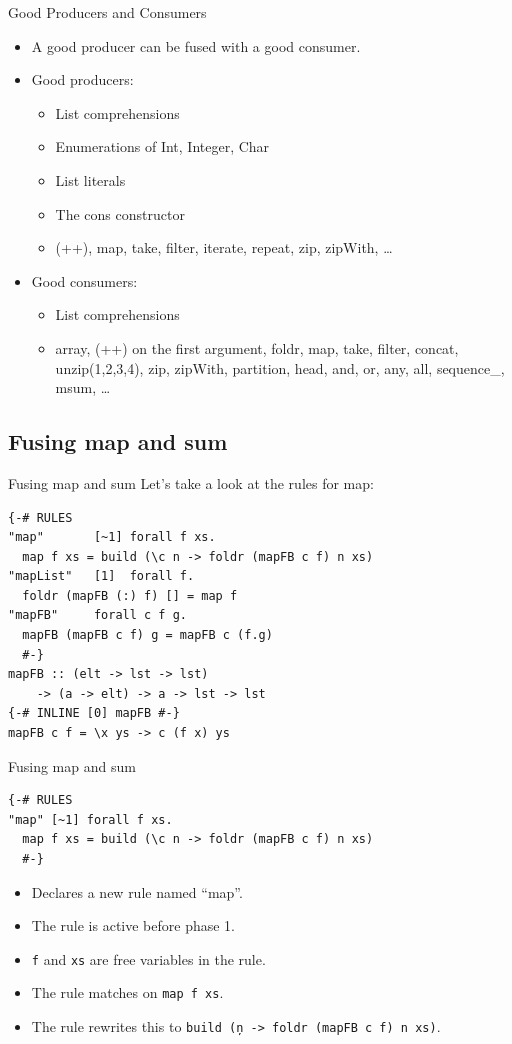 \documentclass[11pt]{beamer}
\begin{document}
\begin{frame}{Good Producers and Consumers}
	\begin{itemize}
		\item A good producer can be fused with a good consumer.
		\item Good producers:
		\begin{itemize}
			\item List comprehensions
			\item Enumerations of Int, Integer, Char
			\item List literals
			\item The cons constructor
			\item (++), map, take, filter, iterate, repeat, zip, zipWith, \dots
		\end{itemize}
		\item Good consumers:
		\begin{itemize}
			\item List comprehensions
			\item array, (++) on the first argument, foldr, map, take, filter, concat, unzip(1,2,3,4), zip, zipWith, partition, head, and, or, any, all, sequence\_, msum, \dots
		\end{itemize}
	\end{itemize}
\end{frame}

\subsection{Fusing map and sum}

\begin{frame}[fragile]{Fusing map and sum}
Let's take a look at the rules for map:
\begin{verbatim}
{-# RULES
"map"       [~1] forall f xs.
  map f xs = build (\c n -> foldr (mapFB c f) n xs)
"mapList"   [1]  forall f.
  foldr (mapFB (:) f) [] = map f
"mapFB"     forall c f g.
  mapFB (mapFB c f) g = mapFB c (f.g)
  #-}
mapFB :: (elt -> lst -> lst)
    -> (a -> elt) -> a -> lst -> lst
{-# INLINE [0] mapFB #-}
mapFB c f = \x ys -> c (f x) ys
\end{verbatim}
\end{frame}

\begin{frame}[fragile]{Fusing map and sum}
\begin{verbatim}
{-# RULES
"map" [~1] forall f xs.
  map f xs = build (\c n -> foldr (mapFB c f) n xs)
  #-}
\end{verbatim}
\begin{itemize}
	\item Declares a new rule named ``map''.
	\item The rule is active before phase 1.
	\item \texttt{f} and \texttt{xs} are free variables in the rule.
	\item The rule matches on \texttt{map f xs}.
	\item The rule rewrites this to \texttt{build (\c n -> foldr (mapFB c f) n xs)}.
\end{itemize}
\end{frame}
\end{document}
